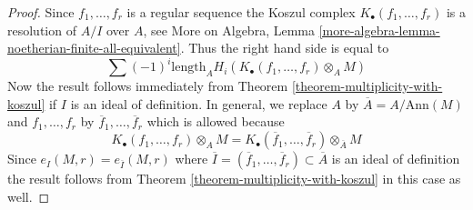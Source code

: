 \documentclass[10pt,a4paper]{amsart}
\theoremstyle{plain}
\theoremstyle{definition}
\theoremstyle{remark}
\numberwithin{equation}{subsection}
\begin{document}
\begin{proof}
Since $f_1, \ldots, f_r$ is a regular sequence the Koszul complex
$K_\bullet(f_1, \ldots, f_r)$ is a resolution of $A/I$ over $A$, see
More on Algebra, Lemma
\ref{more-algebra-lemma-noetherian-finite-all-equivalent}.
Thus the right hand side is equal to
$$
\sum (-1)^i\text{length}_A H_i(K_\bullet(f_1, \ldots, f_r) \otimes_A M)
$$
Now the result follows immediately from
Theorem \ref{theorem-multiplicity-with-koszul} if $I$ is an ideal
of definition. In general, we replace $A$ by $\overline{A} = A/\text{Ann}(M)$
and $f_1, \ldots, f_r$ by $\overline{f}_1, \ldots, \overline{f}_r$
which is allowed because
$$
K_\bullet(f_1, \ldots, f_r) \otimes_A M =
K_\bullet(\overline{f}_1, \ldots, \overline{f}_r) \otimes_{\overline{A}} M
$$
Since $e_I(M, r) = e_{\overline{I}}(M, r)$ where
$\overline{I} = (\overline{f}_1, \ldots, \overline{f}_r) \subset \overline{A}$
is an ideal of definition the result follows from
Theorem \ref{theorem-multiplicity-with-koszul} in this case as well.
\end{proof}
\end{document}
